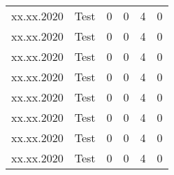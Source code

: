 \begin{landscape}
\begin{longtable}[c]{lp{10cm}rrrr}
	xx.xx.2020 
	& Test
	& 0 %
	& 0 %
	& 4 %
	& 0\\ %

	xx.xx.2020 
	& Test
	& 0 %
	& 0 %
	& 4 %
	& 0\\ %

	xx.xx.2020 
	& Test
	& 0 %
	& 0 %
	& 4 %
	& 0\\ %

	xx.xx.2020 
	& Test
	& 0 %
	& 0 %
	& 4 %
	& 0\\ %
	
	xx.xx.2020 
	& Test
	& 0 %
	& 0 %
	& 4 %
	& 0\\ %

	xx.xx.2020 
	& Test
	& 0 %
	& 0 %
	& 4 %
	& 0\\ %

	xx.xx.2020 
	& Test
	& 0 %
	& 0 %
	& 4 %
	& 0\\ %

	xx.xx.2020 
	& Test
	& 0 %
	& 0 %
	& 4 %
	& 0\\ %
	
\end{longtable}


\end{landscape}
